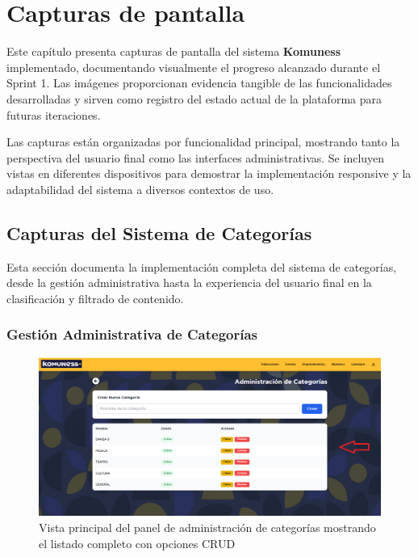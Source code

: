 \chapter{Capturas de pantalla}

Este capítulo presenta capturas de pantalla del sistema \textbf{Komuness} implementado, documentando visualmente el progreso alcanzado durante el Sprint 1. 
Las imágenes proporcionan evidencia tangible de las funcionalidades desarrolladas y sirven como registro del estado actual de la plataforma para futuras iteraciones.

Las capturas están organizadas por funcionalidad principal, mostrando tanto la perspectiva del usuario final como las interfaces administrativas. 
Se incluyen vistas en diferentes dispositivos para demostrar la implementación responsive y la adaptabilidad del sistema a diversos contextos de uso.

\section{Capturas del Sistema de Categorías}

Esta sección documenta la implementación completa del sistema de categorías, desde la gestión administrativa hasta la experiencia del usuario final en la clasificación y filtrado de contenido.

\subsection*{Gestión Administrativa de Categorías}

\begin{figure}[H]
  \centering
  \includegraphics[width=\textwidth]{project/images/6.1.png}
  \caption{Vista principal del panel de administración de categorías mostrando el listado completo con opciones CRUD}
  \label{fig:cat-admin}
\end{figure}

